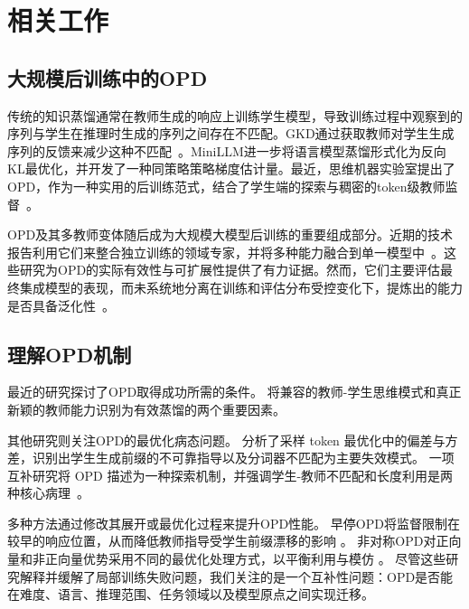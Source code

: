 \appendix
\section{相关工作}
\label{appendix:related_work}

\subsection{大规模后训练中的OPD}



传统的知识蒸馏通常在教师生成的响应上训练学生模型，导致训练过程中观察到的序列与学生在推理时生成的序列之间存在不匹配。GKD通过获取教师对学生生成序列的反馈来减少这种不匹配~\cite{agarwal2024policy}。MiniLLM进一步将语言模型蒸馏形式化为反向KL最优化，并开发了一种同策略策略梯度估计量\cite{gu2024minillm}。最近，思维机器实验室提出了OPD，作为一种实用的后训练范式，结合了学生端的探索与稠密的token级教师监督~\cite{lu2025onpolicydistillation}。


OPD及其多教师变体随后成为大规模大模型后训练的重要组成部分。近期的技术报告利用它们来整合独立训练的领域专家，并将多种能力融合到单一模型中~\cite{
coreteam2026mimov2flashtechnicalreport,
xu2026deepseek,
yang2026nemotron,
huang2026kat,
team2026mach}。这些研究为OPD的实际有效性与可扩展性提供了有力证据。然而，它们主要评估最终集成模型的表现，而未系统地分离在训练和评估分布受控变化下，提炼出的能力是否具备泛化性~\citep{li2026rolereasoningpatternsgeneralization,ren2026rethinkinggeneralizationreasoningsft,chu2025sft,garcia2025exploringllmscapturerepresent}。

\subsection{理解OPD机制}


最近的研究探讨了OPD取得成功所需的条件。
\citet{li2026rethinking} 将兼容的教师-学生思维模式和真正新颖的教师能力识别为有效蒸馏的两个重要因素。


其他研究则关注OPD的最优化病态问题。
\citet{fu2026revisiting} 分析了采样 token 最优化中的偏差与方差，识别出学生生成前缀的不可靠指导以及分词器不匹配为主要失效模式。  
一项互补研究将 OPD 描述为一种探索机制，并强调学生-教师不匹配和长度利用是两种核心病理~\cite{wang2026demystifying}。


多种方法通过修改其展开或最优化过程来提升OPD性能。  
早停OPD将监督限制在较早的响应位置，从而降低教师指导受学生前缀漂移的影响 \cite{ziheng2026less}。  
非对称OPD对正向量和非正向量优势采用不同的最优化处理方式，以平衡利用与模仿 \cite{jia2026asymmetric}。  
尽管这些研究解释并缓解了局部训练失败问题，我们关注的是一个互补性问题：OPD是否能在难度、语言、推理范围、任务领域以及模型原点之间实现迁移。

